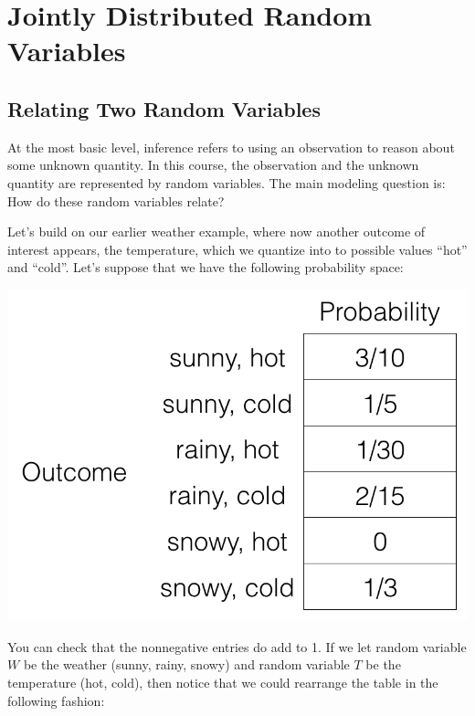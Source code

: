 \documentclass[6008notes.tex]{subfiles}
\begin{document}
\graphicspath{ {images/jointdist/} }

\section{Jointly Distributed Random Variables}

\subsection{Relating Two Random Variables}

At the most basic level, inference refers to using an observation to reason about some unknown quantity. In this course, the observation and the unknown quantity are represented by random variables. The main modeling question is: How do these random variables relate?

Let's build on our earlier weather example, where now another outcome of interest appears, the temperature, which we quantize into to possible values ``hot'' and ``cold''. Let's suppose that we have the following probability space:

{\centering\includegraphics[scale=0.4]{images_sec-joint-rv-prob-space}}

You can check that the nonnegative entries do add to 1. If we let random variable $W$ be the weather (sunny, rainy, snowy) and random variable $T$ be the temperature (hot, cold), then notice that we could rearrange the table in the following fashion:
\end{document}
